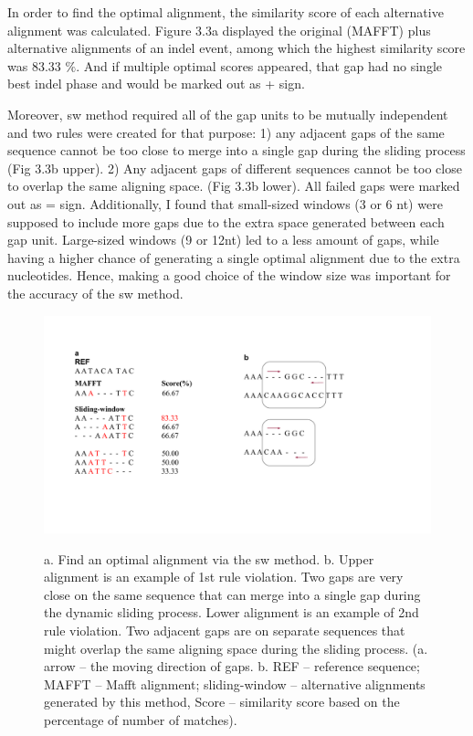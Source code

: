 In order to find the optimal alignment, the similarity score of each alternative alignment was calculated. Figure 3.3a displayed the original (MAFFT) plus alternative alignments of an indel event, among which the highest similarity score was 83.33 $\%$. And if multiple optimal scores appeared, that gap had no single best indel phase and would be marked out as + sign.  

Moreover, sw method required all of the gap units to be mutually independent and two  rules were created for that purpose: 1) any adjacent gaps of the same sequence cannot be too close to merge into a single gap during the sliding process (Fig 3.3b upper). 2) Any adjacent gaps of different sequences cannot be too close to overlap the same aligning space. (Fig 3.3b lower). All failed gaps were marked out as = sign. 
Additionally, I found that small-sized windows (3 or 6 nt) were supposed to include more gaps due to the extra space generated between each gap unit. Large-sized windows (9 or 12nt) led to a less amount of gaps, while having a higher chance of generating a single optimal alignment due to the extra nucleotides. Hence, making a good choice of the window size was important for the accuracy of the sw method.

\begin{figure}[H]
     \centering
     \begin{minipage}[t]{1\textwidth }
     \includegraphics[width=1.2\linewidth]{Fig3.pdf}
     {{a. Find an optimal alignment via the sw method. b. Upper alignment is an example of 1st rule violation. Two gaps are very close on the same sequence that can merge into a single gap during the dynamic sliding process. Lower alignment is an example of 2nd rule violation. Two adjacent gaps are on separate sequences that might overlap the same aligning space during the sliding process. (a. arrow -- the moving direction of gaps. b. REF -- reference sequence; MAFFT -- Mafft alignment; sliding-window -- alternative alignments generated by this method, Score -- similarity score based on the percentage of number of matches).} 
 \par}
     \end{minipage}
\end{figure}

